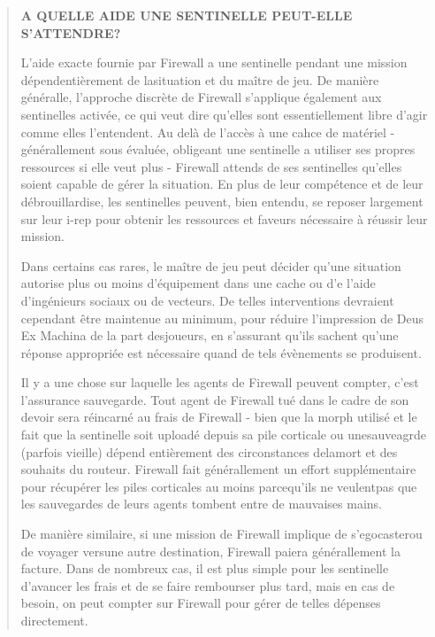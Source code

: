 \begin{quotation} \begin{large} \textbf{A QUELLE AIDE UNE SENTINELLE PEUT-ELLE S'ATTENDRE?} \end{large} 

L'aide exacte fournie par Firewall a une sentinelle pendant une mission dépendentièrement de lasituation et du maître de jeu. De manière généralle, l'approche discrète de Firewall s'applique également aux sentinelles activée, ce qui veut dire qu'elles sont essentiellement libre d'agir comme elles l'entendent. Au delà de l'accès à une cahce de matériel - générallement sous évaluée, obligeant une sentinelle a utiliser ses propres ressources si elle veut plus - Firewall attends de ses sentinelles qu'elles soient capable de gérer la situation. En plus de leur compétence et de leur débrouillardise, les sentinelles peuvent, bien entendu, se reposer largement sur leur i-rep pour obtenir les ressources et faveurs nécessaire à réussir leur mission. 

Dans certains cas rares, le maître de jeu peut décider qu'une situation autorise plus ou moins d'équipement dans une cache ou d'e l'aide d'ingénieurs sociaux ou de vecteurs. De telles interventions devraient cependant être maintenue au minimum, pour réduire l'impression de Deus Ex Machina de la part desjoueurs, en s'assurant qu'ils sachent qu'une réponse appropriée est nécessaire quand de tels évènements se produisent. 

Il y a une chose sur laquelle les agents de Firewall peuvent compter, c'est l'assurance sauvegarde. Tout agent de Firewall tué dans le cadre de son devoir sera réincarné au frais de Firewall - bien que la morph utilisé et le fait que la sentinelle soit uploadé depuis sa pile corticale ou unesauveagrde (parfois vieille) dépend entièrement des circonstances delamort et des souhaits du routeur. Firewall fait générallement un effort supplémentaire pour récupérer les piles corticales au moins parcequ'ils ne veulentpas que les sauvegardes de leurs agents tombent entre de mauvaises mains. 

De manière similaire, si une mission de Firewall implique de s'egocasterou de voyager versune autre destination, Firewall paiera générallement la facture. Dans de nombreux cas, il est plus simple pour les sentinelle d'avancer les frais et de se faire rembourser plus tard, mais en cas de besoin, on peut compter sur Firewall pour gérer de telles dépenses directement. \end{quotation} 



